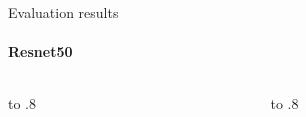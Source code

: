 \documentclass[aspectratio=169]{beamer}
\begin{document}
\begin{frame}{Evaluation results}
\framesubtitle{Resnet50}
\begin{columns}[T]
    \begin{column}{0.8\textwidth}\vbox to .8\end{column}
    \begin{column}{0.2\textwidth}\vbox to .8\end{column}
    \end{columns}
\end{frame}
\end{document}
